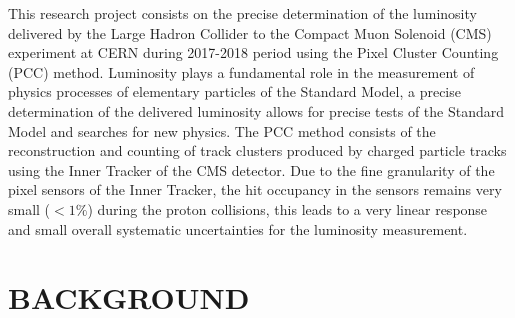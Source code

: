\documentclass[final,12pt]{article}
\begin{document}
  \vspace{1 cm}
 
  
  This research project consists on the precise determination of the luminosity delivered by the Large Hadron Collider to the Compact Muon Solenoid (CMS) experiment at CERN during 2017-2018 period  using the Pixel Cluster Counting (PCC) method.
  Luminosity plays a fundamental role in the  measurement of physics processes of elementary particles of the Standard Model, a precise determination of the delivered luminosity allows for precise tests of the Standard Model and searches for new physics.
The PCC method consists of the reconstruction and counting of track clusters produced by charged particle tracks using the Inner Tracker of the CMS detector.
Due to the fine granularity of the pixel sensors of the Inner Tracker, the hit occupancy in the sensors remains very small ($<1\%$) during the proton collisions, this leads to a very linear response and small overall systematic uncertainties for the luminosity measurement.   
  \hspace{2pt}
\vfill



\newpage
\section{BACKGROUND}
\end{document}
